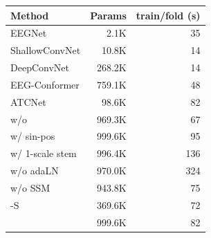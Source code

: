 \begin{tabular}{lrr}
\toprule
Method & Params & train/fold (s) \\
\midrule
EEGNet & 2.1K & 35 \\
ShallowConvNet & 10.8K & 14 \\
DeepConvNet & 268.2K & 14 \\
EEG-Conformer & 759.1K & 48 \\
ATCNet & 98.6K & 82 \\
\method{} w/o \scn{} & 969.3K & 67 \\
\method{} w/ sin-pos & 999.6K & 95 \\
\method{} w/ 1-scale stem & 996.4K & 136 \\
\method{} w/o adaLN & 970.0K & 324 \\
\method{} w/o SSM & 943.8K & 75 \\
\method{}-S & 369.6K & 72 \\
\method{} & 999.6K & 82 \\
\bottomrule
\end{tabular}
